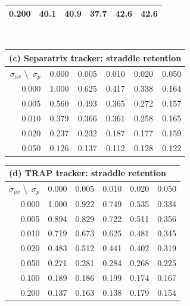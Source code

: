 \documentclass[lettersize,journal]{IEEEtran}
\begin{document}
\begin{table}[!t]
\begin{tabular}{r|rrrrr}
0.200 &  40.1 & 40.9 & 37.7 & 42.6 & 42.6 \\
\hline
\end{tabular}
\\[8pt]
\begin{tabular}{r|rrrrr}
\multicolumn{6}{l}{(c) Separatrix tracker: straddle retention} \\
\hline
$\sigma_{uv}$ \textbackslash\ $\sigma_p$ & 0.000 & 0.005 & 0.010 & 0.020 & 0.050 \\
\hline
0.000 & 1.000 & 0.625 & 0.417 & 0.338 & 0.164 \\
0.005 & 0.560 & 0.493 & 0.365 & 0.272 & 0.157 \\
0.010 & 0.379 & 0.366 & 0.361 & 0.258 & 0.165 \\
0.020 & 0.237 & 0.232 & 0.187 & 0.177 & 0.159 \\
0.050 & 0.126 & 0.137 & 0.112 & 0.128 & 0.122 \\
\hline
\end{tabular}
\hspace{1.5em}
\begin{tabular}{r|rrrrr}
\multicolumn{6}{l}{(d) TRAP tracker: straddle retention} \\
\hline
$\sigma_{uv}$ \textbackslash\ $\sigma_p$ & 0.000 & 0.005 & 0.010 & 0.020 & 0.050 \\
\hline
0.000 & 1.000 & 0.922 & 0.749 & 0.535 & 0.334 \\
0.005 & 0.894 & 0.829 & 0.722 & 0.511 & 0.356 \\
0.010 & 0.719 & 0.673 & 0.625 & 0.481 & 0.345 \\
0.020 & 0.483 & 0.512 & 0.441 & 0.402 & 0.319 \\
0.050 & 0.271 & 0.281 & 0.284 & 0.268 & 0.225 \\
0.100 & 0.189 & 0.186 & 0.199 & 0.174 & 0.167 \\
0.200 & 0.137 & 0.163 & 0.138 & 0.179 & 0.154 \\
\hline
\end{tabular}
\end{table}
\end{document}
